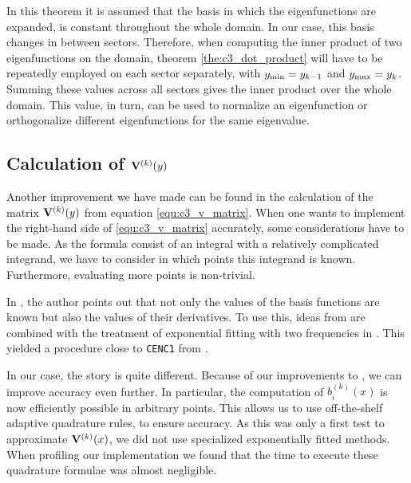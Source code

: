 In this theorem it is assumed that the basis in which the eigenfunctions are expanded, is constant throughout the whole domain. In our case, this basis changes in between sectors. Therefore, when computing the inner product of two eigenfunctions on the domain, theorem \ref{the:c3_dot_product} will have to be repeatedly employed on each sector separately, with ${y_{\text{min}}} = y_{k-1}$ and ${y_{\text{max}}} = y_k$. Summing these values across all sectors gives the inner product over the whole domain. This value, in turn, can be used to normalize an eigenfunction or orthogonalize different eigenfunctions for the same eigenvalue.

\subsection{Calculation of \texorpdfstring{$\vb{V}^{(k)}(y)$}{Vk(y)}}\label{sec:c3_calculate_vk}

Another improvement we have made can be found in the calculation of the matrix $\vb{V}^{(k)}(y)$ from equation \eqref{equ:c3_v_matrix}. When one wants to implement the right-hand side of \eqref{equ:c3_v_matrix} accurately, some considerations have to be made. As the formula consist of an integral with a relatively complicated integrand, we have to consider in which points this integrand is known. Furthermore, evaluating more points is non-trivial.

In \cite{ixaru_new_2010}, the author points out that not only the values of the basis functions are known but also the values of their derivatives. To use this, ideas from \cite{kim_quadrature_2002} are combined with the treatment of exponential fitting with two frequencies in \cite{ixaru_operations_1997}. This yielded a procedure close to \texttt{CENC1} from \cite{ixaru_exponential_2004}.

In our case, the story is quite different. Because of our improvements to \matslise{}, we can improve accuracy even further. In particular, the computation of $b_i^{(k)}(x)$ is now efficiently possible in arbitrary points. This allows us to use off-the-shelf adaptive quadrature rules, to ensure accuracy. As this was only a first test to approximate $\vb{V}^{(k)}(x)$, we did not use specialized exponentially fitted methods. When profiling our implementation we found that the time to execute these quadrature formulae was almost negligible.

